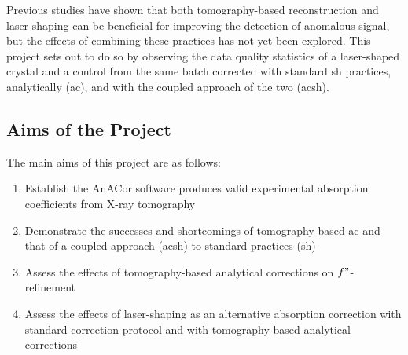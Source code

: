 Previous studies have shown that both tomography-based reconstruction and laser-shaping can be beneficial for improving the detection of anomalous signal, but the effects of combining these practices has not yet been explored. This project sets out to do so by observing the data quality statistics of a laser-shaped crystal and a control from the same batch corrected with standard \ac{sh} practices, analytically (\ac{ac}), and with the coupled approach of the two (\ac{acsh}).

\subsection{Aims of the Project} %

The main aims of this project are as follows:

\begin{enumerate}
    \item Establish the AnACor software produces valid experimental absorption coefficients from X-ray tomography
    \item Demonstrate the successes and shortcomings of tomography-based \ac{ac} and that of a coupled approach (\ac{acsh}) to standard practices (\ac{sh})
    \item Assess the effects of tomography-based analytical corrections on $f"$-refinement
    \item Assess the effects of laser-shaping as an alternative absorption correction with standard correction protocol and with tomography-based analytical corrections
\end{enumerate}